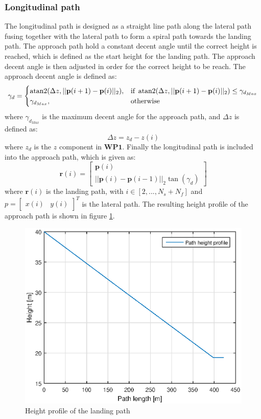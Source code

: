 \subsubsection{Longitudinal path}
The longitudinal path is designed as a straight line path along the lateral path fusing together with the lateral path to form a spiral path towards the landing path. The approach path hold a constant decent angle until the correct height is reached, which is defined as the start height for the landing path. The approach decent angle is then adjusted in order for the correct height to be reach. The approach decent angle is defined as:
\begin{equation}
\gamma_d = \begin{cases}
\atan2(\Delta z,||\mathbf{p}(i+1)-\mathbf{p}(i)||_2), & \text{if } \atan2(\Delta z,||\mathbf{p}(i+1)-\mathbf{p}(i)||_2)\leq \gamma_{d_{Max}} \\
\gamma_{d_{Max}},										& \text{otherwise}
\end{cases}
\end{equation}
where $\gamma_{d_{Max}}$ is the maximum decent angle for the approach path, and $\Delta z$ is defined as:
\begin{equation}
\Delta z = z_d-z(i)
\end{equation}
where $z_d$ is the $z$ component in $\textbf{WP1}$. Finally the longitudinal path is included into the approach path, which is given as:
\begin{equation}
\mathbf{r}(i) = \begin{bmatrix}
\mathbf{p}(i) \\
||\mathbf{p}(i)-\mathbf{p}(i-1)||_2\tan(\gamma_d)
\end{bmatrix}
\end{equation}
where $\mathbf{r}(i)$ is the landing path, with $i \in [2,...,N_s+N_f]$ and 
$p = \begin{bmatrix}
x(i) & y(i)
\end{bmatrix}^T$ is the lateral path. The resulting height profile of the approach path is shown in figure \ref{Fig:HeightProfile}.
\begin{figure}[H]
	\centering
		\includegraphics[width=1\textwidth]{figs/SysPlot/heightProfile.eps}
		\caption{Height profile of the landing path}
		\label{Fig:HeightProfile}
\end{figure}
